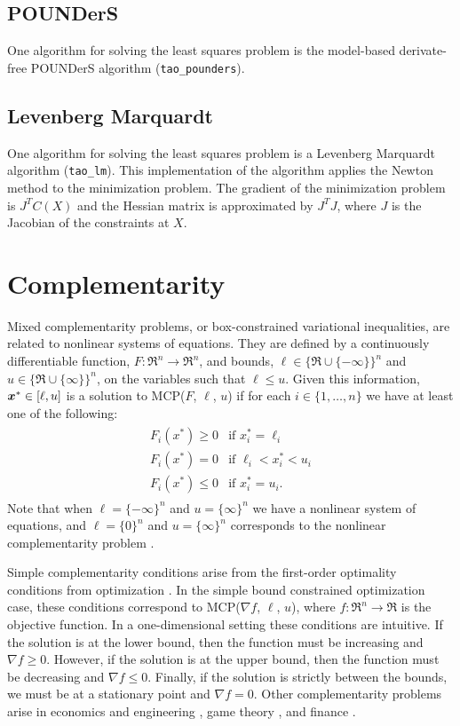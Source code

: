 \subsection{POUNDerS}
   One algorithm for solving the least squares problem is the model-based
derivate-free POUNDerS algorithm (\texttt{tao\_pounders}).


\subsection{Levenberg Marquardt}
   One algorithm for solving the least squares problem is a Levenberg
Marquardt algorithm (\texttt{tao\_lm}).  This implementation of the 
algorithm applies the Newton  method to the minimization problem.
The gradient of the minimization
problem is $J^T C(X)$ and the Hessian matrix is approximated by
$J^T J$, where $J$ is the Jacobian of the constraints at $X$.


\section{Complementarity}
\label{sec:complementarity}

Mixed complementarity problems, or box-constrained variational inequalities,
are related to nonlinear systems of equations.  They are defined by a 
continuously differentiable function,
$F:\Re^n \to \Re^n$, and bounds, $\ell \in \{\Re \cup \{-\infty\}\}^n$ 
and $u \in \{\Re \cup \{\infty\}\}^n$, on the variables such that 
$\ell \leq u$.  Given this information, $\mbox{\boldmath \(x\)}^* \in [\ell,u]$ is a solution to 
MCP($F$, $\ell$, $u$) if for each $i \in \{1, \ldots, n\}$ we have at
least one of the following:
\begin{eqnarray*}
\begin{array}{ll}
F_i(x^*) \geq 0 & \mbox{if } x^*_i = \ell_i \\
F_i(x^*) = 0 & \mbox{if } \ell_i < x^*_i < u_i \\
F_i(x^*) \leq 0 & \mbox{if } x^*_i = u_i.
\end{array}
\end{eqnarray*}
Note that when $\ell = \{-\infty\}^n$ and $u = \{\infty\}^n$ we have a 
nonlinear system of equations, and $\ell = \{0\}^n$ and $u = \{\infty\}^n$ 
corresponds to the nonlinear complementarity problem \cite{cottle:nonlinear}.

Simple complementarity conditions arise from the first-order optimality 
conditions from optimization \cite{karush:minima, kuhn.tucker:nonlinear}.  
In the simple bound constrained optimization case, these conditions 
correspond to MCP($\nabla f$, $\ell$, $u$), where $f: \Re^n \to \Re$ 
is the objective function.  In a one-dimensional setting these conditions 
are intuitive.  If the solution is at the lower bound, then the function must 
be increasing and $\nabla f \geq 0$.  However, if the solution is at the 
upper bound, then the function must be decreasing and $\nabla f \leq 0$.  
Finally, if the solution 
is strictly between the bounds, we must be at a stationary point and 
$\nabla f = 0$.  Other complementarity problems arise in economics and 
engineering \cite{ferris.pang:engineering}, game 
theory \cite{nash:equilibrium}, and finance \cite{huang.pang:option}.


